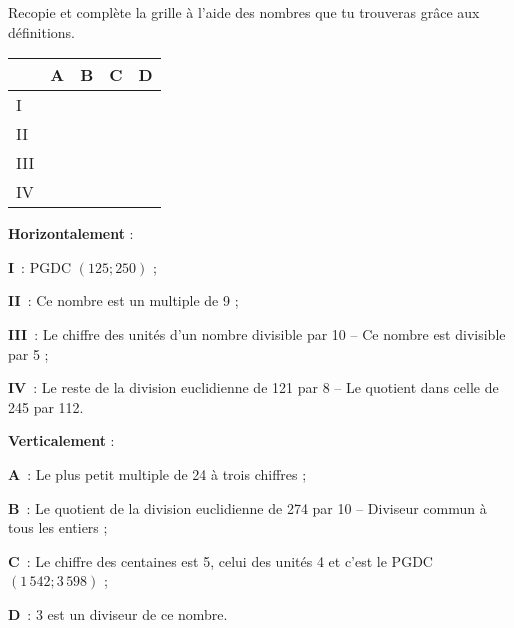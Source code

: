 \begin{exercice}
Recopie et complète la grille à l'aide des nombres que tu trouveras grâce aux définitions.

\begin{center}
\renewcommand*\tabularxcolumn[1]{>{\centering\arraybackslash}m{#1}}
\begin{tabularx}{.6\linewidth}{|X|X|X|X|X|} 
\cline{2-5}
\multicolumn{1}{c|}{} & \cellcolor {F2} A & \cellcolor {F2} B & \cellcolor {F2} C & \cellcolor {F2} D \\\hline
\cellcolor{H1} I & \cellcolor{G3} & \cellcolor{G3} & \cellcolor{G3} & \cellcolor{Noir} \\\hline
\cellcolor{H1} II & \cellcolor{G3} & \cellcolor{G3} & \cellcolor{G3} & \cellcolor{G3} \\\hline
\cellcolor{H1} III & \cellcolor{G3} & \cellcolor{Noir} & \cellcolor{G3} & \cellcolor{G3} \\\hline
\cellcolor{H1} IV & \cellcolor{Noir} & \cellcolor{G3} & \cellcolor{Noir} & \cellcolor{G3} \\\hline
\end{tabularx}
\end{center}

\textbf{Horizontalement} :

\textcolor{H1}{\textbf{I}} : PGDC $(125 ; 250)$ ;

\textcolor{H1}{\textbf{II}} : Ce nombre est un multiple de 9 ;

\textcolor{H1}{\textbf{III}} : Le chiffre des unités d'un nombre divisible par 10 -- Ce nombre est divisible par 5 ;

\textcolor{H1}{\textbf{IV}} : Le reste de la division euclidienne de 121 par 8 -- Le quotient dans celle de 245 par 112.

\textbf{Verticalement} :

\textcolor{F2}{\textbf{A}} : Le plus petit multiple de 24 à trois chiffres ;

\textcolor{F2}{\textbf{B}} : Le quotient de la division euclidienne de 274 par 10 -- Diviseur commun à tous les entiers ;

\textcolor{F2}{\textbf{C}} : Le chiffre des centaines est 5, celui des unités 4 et c'est le PGDC $(1\,542 ; 3\,598)$ ;

\textcolor{F2}{\textbf{D}} : 3 est un diviseur de ce nombre.
\end{exercice}

\newpage


